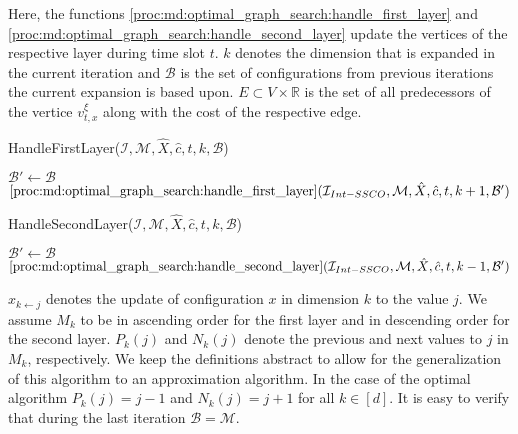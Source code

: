 Here, the functions \ref{proc:md:optimal_graph_search:handle_first_layer} and \ref{proc:md:optimal_graph_search:handle_second_layer} update the vertices of the respective layer during time slot $t$. $k$ denotes the dimension that is expanded in the current iteration and $\mathcal{B}$ is the set of configurations from previous iterations the current expansion is based upon. $E \subset V \times \mathbb{R}$ is the set of all predecessors of the vertice $v_{t,x}^{\xi}$ along with the cost of the respective edge.

\begin{function}
	\caption{HandleFirstLayer($\mathcal{I}, \mathcal{M}, \hat{X}, \hat{c}, t, k, \mathcal{B}$)}\label{proc:md:optimal_graph_search:handle_first_layer}
	$\mathcal{B}' \gets \mathcal{B}$\;
    \Return $\text{\ref{proc:md:optimal_graph_search:handle_first_layer}}(\mathcal{I}_{Int-SSCO}, \mathcal{M}, \hat{X}, \hat{c}, t, k+1, \mathcal{B}')$\;
\end{function}

\begin{function}
	\caption{HandleSecondLayer($\mathcal{I}, \mathcal{M}, \hat{X}, \hat{c}, t, k, \mathcal{B}$)}\label{proc:md:optimal_graph_search:handle_second_layer}
	$\mathcal{B}' \gets \mathcal{B}$\;
    \Return $\text{\ref{proc:md:optimal_graph_search:handle_second_layer}}(\mathcal{I}_{Int-SSCO}, \mathcal{M}, \hat{X}, \hat{c}, t, k-1, \mathcal{B}')$\;
\end{function}

$x_{k \gets j}$ denotes the update of configuration $x$ in dimension $k$ to the value $j$. We assume $M_k$ to be in ascending order for the first layer and in descending order for the second layer. $P_k(j)$ and $N_k(j)$ denote the previous and next values to $j$ in $M_k$, respectively. We keep the definitions abstract to allow for the generalization of this algorithm to an approximation algorithm. In the case of the optimal algorithm $P_k(j) = j-1$ and $N_k(j) = j+1$ for all $k \in [d]$. It is easy to verify that during the last iteration $\mathcal{B} = \mathcal{M}$.

